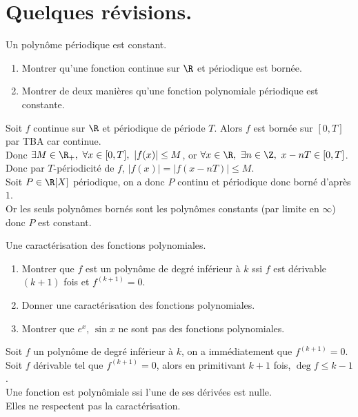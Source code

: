 \documentclass[11pt]{article}
\begin{document}


\thispagestyle{fancy}

\section{Quelques révisions.}

\begin{ex}{Un polynôme périodique est constant.}{}
    \begin{enumerate}
        \item Montrer qu'une fonction continue sur $\R$ et périodique est bornée.
        \item Montrer de deux manières qu'une fonction polynomiale périodique est constante.
    \end{enumerate}
    \tcblower
     Soit $f$ continue sur $\R$ et périodique de période $T$. Alors $f$ est bornée sur $[0,T]$ par TBA car continue.\\
    Donc $\exists M \in \R_+, ~ \forall x \in [0,T], ~ |f(x)| \leq M$, or $\forall x \in \R, ~ \exists n \in \Z, ~ x-nT\in[0,T]$.\\
    Donc par $T$-périodicité de $f$, $|f(x)|=|f(x-nT)|\leq M$.\\
     Soit $P\in\R[X]$ périodique, on a donc $P$ continu et périodique donc borné d'après $1.$\\
    Or les seuls polynômes bornés sont les polynômes constants (par limite en $\infty$) donc $P$ est constant.
\end{ex}

\begin{ex}{Une caractérisation des fonctions polynomiales.}{}
    \begin{enumerate}
        \item Montrer que $f$ est un polynôme de degré inférieur à $k$ ssi $f$ est dérivable $(k+1)$ fois et $f^{(k+1)}=0$.
        \item Donner une caractérisation des fonctions polynomiales.
        \item Montrer que $e^x$, $\sin x$ ne sont pas des fonctions polynomiales.
    \end{enumerate}
    \tcblower
     Soit $f$ un polynôme de degré inférieur à $k$, on a immédiatement que $f^{(k+1)}=0$.\\
     Soit $f$ dérivable tel que $f^{(k+1)}=0$, alors en primitivant $k+1$ fois, $\deg f \leq k - 1$.\\
     Une fonction est polynômiale ssi l'une de ses dérivées est nulle.\\
     Elles ne respectent pas la caractérisation.
\end{ex}
\end{document}
